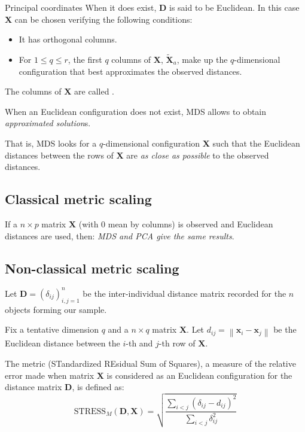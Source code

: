 \begin{definition}{Principal coordinates}
When it does exist, $\boldsymbol{D}$ is said to be Euclidean. In this
case $\boldsymbol{X}$ can be chosen verifying the following conditions:
\begin{itemize}
	\item It has orthogonal columns.
	\item For $1 \leq q \leq r$, the first $q$ columns of $\boldsymbol{X}$,
	      $\boldsymbol{\tilde{X}}_a$, make up the $q$-dimensional configuration that
	      best approximates the observed distances.
\end{itemize}
The columns of $\boldsymbol{X}$ are called .

\tcblower

\begin{note}
When an Euclidean configuration does not exist, MDS allows to
obtain \emph{approximated solution}s.

That is, MDS looks for a $q$-dimensional
configuration $\boldsymbol{X}$ such that the Euclidean distances between
the rows of $\boldsymbol{X}$ are \emph{as close as possible} to the observed
distances.
\end{note}
\end{definition}


\subsection{Classical metric scaling}

If a $n \times p$ matrix $\boldsymbol{X}$ (with 0 mean by columns) is observed
and Euclidean distances are used, then: \emph{MDS and PCA give the same results}.

\subsection{Non-classical metric scaling}%
\label{sec:non-classical-metric-scaling}

Let $\boldsymbol{D} = (\delta_{ij})^n_{i,j=1}$ be the inter-individual distance
matrix recorded for the $n$ objects forming our sample.

Fix a tentative dimension $q$ and a $n \times q$ matrix $\boldsymbol{X}$.
Let $d_{ij} = \left\lVert \boldsymbol{x}_i - \boldsymbol{x}_j \right\rVert$ be the
Euclidean distance between the $i$-th and $j$-th row of $\boldsymbol{X}$.

The metric  (STandardized REsidual Sum of Squares), a measure
of the relative error made when matrix $\boldsymbol{X}$ is considered as
an Euclidean configuration for the distance matrix $\boldsymbol{D}$, is defined as:
\begin{equation*}
	\text{STRESS}_M(\boldsymbol{D}, \boldsymbol{X}) = \sqrt{\frac
		{\sum_{i<j}(\delta_{ij} - d_{ij})^2}
		{\sum_{i<j}\delta_{ij}^2}
	}
\end{equation*}

